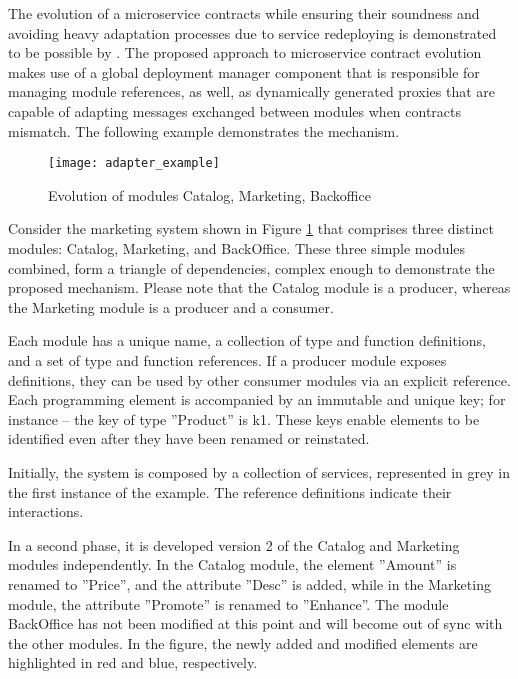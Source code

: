 The evolution of a microservice contracts while ensuring their soundness and
avoiding heavy adaptation processes due to service redeploying is demonstrated to be possible by \citeauthor{seco2020robust} \cite{seco2020robust}.
The proposed approach to microservice contract evolution \cite{seco2020robust} makes use of a global deployment manager component that is responsible for managing module references,
as well, as dynamically generated proxies that are capable of adapting messages exchanged between modules when contracts mismatch.
The following example demonstrates the mechanism.

\begin{figure}[htbp]
    \centering
    \texttt{[image: adapter\_example]}
    \caption{Evolution of modules Catalog, Marketing, Backoffice \cite{seco2020robust}}
    \label{fig:evolution_of_modules}
\end{figure}

Consider the marketing system shown in Figure \ref{fig:evolution_of_modules} that comprises three distinct modules: Catalog, Marketing, and BackOffice.
These three simple modules combined, form a triangle of dependencies, complex enough to demonstrate the proposed mechanism.
Please note that the Catalog module is a producer, whereas the Marketing module is a producer and a consumer.

Each module has a unique name, a collection of type and function definitions, and a set of type and function references.
If a producer module exposes definitions, they can be used by other consumer modules via an explicit reference.
Each programming element is accompanied by an immutable and unique key; for instance – the key of type ''Product'' is k1.
These keys enable elements to be identified even after they have been renamed or reinstated.

Initially, the system is composed by a collection of services,
represented in grey in the first instance of the example.
The reference definitions indicate their interactions.

In a second phase, it is developed version 2 of the Catalog and Marketing modules independently.
In the Catalog module, the element ''Amount'' is renamed to ''Price'', and the attribute ''Desc'' is added, while in the Marketing module,
the attribute ''Promote'' is renamed to ''Enhance''.
The module BackOffice has not been modified at this point and will become out of sync with the other modules.
In the figure, the newly added and modified elements are highlighted in red and blue, respectively.

